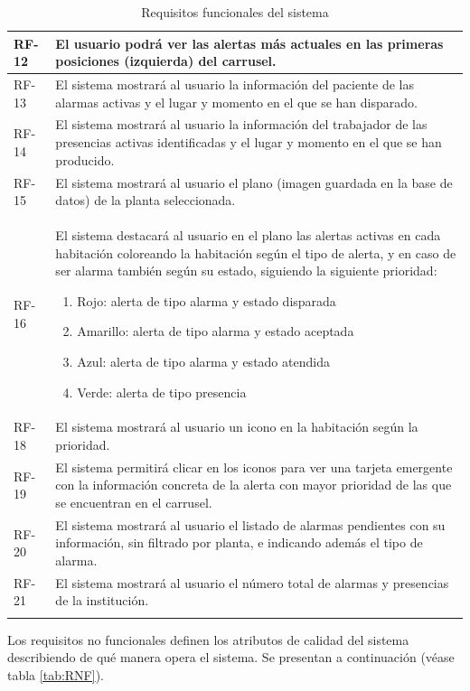 \begin{longtable}{|p{1cm}|p{14cm}|}
	\hline
	RF-12	&	El usuario podrá ver las alertas más actuales en las primeras posiciones (izquierda) del carrusel. \\
	\hline
	RF-13	&	El sistema mostrará al usuario la información del paciente de las alarmas activas y el lugar y momento en el que se han disparado. \\
	\hline
	RF-14	&	El sistema mostrará al usuario la información del trabajador de las presencias activas identificadas y el lugar y momento en el que se han producido. \\
	\hline
	RF-15	&	El sistema mostrará al usuario el plano (imagen guardada en la base de datos) de la planta seleccionada.  \\
	\hline
	RF-16	&	El sistema destacará al usuario en el plano las alertas activas en cada habitación coloreando la habitación según el tipo de alerta, y en caso de ser alarma también según su estado, siguiendo la siguiente prioridad:
	\begin{enumerate}
		\item Rojo: alerta de tipo alarma y estado disparada
		\item Amarillo: alerta de tipo alarma y estado aceptada
		\item Azul: alerta de tipo alarma y estado atendida
		\item Verde: alerta de tipo presencia
	\end{enumerate}\\
	\hline
	RF-18	&	El sistema mostrará al usuario un icono en la habitación según la prioridad. \\
	\hline
	RF-19	&	El sistema permitirá clicar en los iconos para ver una tarjeta emergente con la información concreta de la alerta con mayor prioridad de las que se encuentran en el carrusel. \\
	\hline
	RF-20	&	El sistema mostrará al usuario el listado de alarmas pendientes con su información, sin filtrado por planta, e indicando además el tipo de alarma. \\
	\hline
	RF-21	&	El sistema mostrará al usuario el número total de alarmas y presencias de la institución. \\
	\hline
\caption{Requisitos funcionales del sistema}
\label{tab:RF}
\end{longtable}

Los requisitos no funcionales definen los atributos de calidad del sistema describiendo de qué manera opera el sistema. Se presentan a continuación (véase tabla \ref{tab:RNF}).

